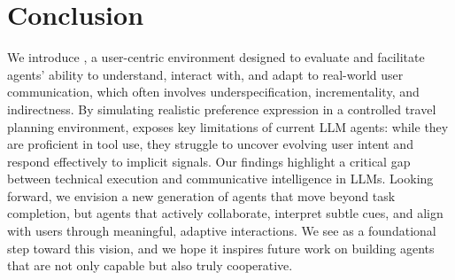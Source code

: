 \section{Conclusion}
We introduce \textbf{{\gymname}}, a user-centric environment designed to evaluate and facilitate agents' ability to understand, interact with, and adapt to real-world user communication, which often involves underspecification, incrementality, and indirectness. By simulating realistic preference expression in a controlled travel planning environment, {\gymname} exposes key limitations of current LLM agents: while they are proficient in tool use, they struggle to uncover evolving user intent and respond effectively to implicit signals. Our findings highlight a critical gap between technical execution and communicative intelligence in LLMs. Looking forward, we envision a new generation of agents that move beyond task completion, but agents that actively collaborate, interpret subtle cues, and align with users through meaningful, adaptive interactions. We see {\gymname} as a foundational step toward this vision, and we hope it inspires future work on building agents that are not only capable but also truly cooperative.


